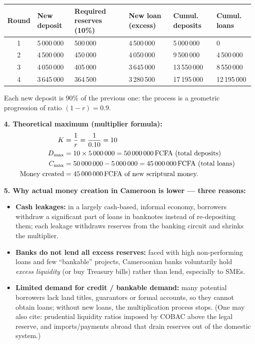 \documentclass[11pt]{article}
\begin{document}
\begin{corrige}
\begin{center}
\begin{tabularx}{\linewidth}{|c|X|X|X|X|X|}
\hline
\rowcolor{popblueL} \textbf{Round} & \textbf{New deposit} & \textbf{Required reserves (10\%)} & \textbf{New loan (excess)} & \textbf{Cumul. deposits} & \textbf{Cumul. loans} \\
\hline
1 & 5\,000\,000 & 500\,000 & 4\,500\,000 & 5\,000\,000 & 0 \\
\hline
2 & 4\,500\,000 & 450\,000 & 4\,050\,000 & 9\,500\,000 & 4\,500\,000 \\
\hline
3 & 4\,050\,000 & 405\,000 & 3\,645\,000 & 13\,550\,000 & 8\,550\,000 \\
\hline
4 & 3\,645\,000 & 364\,500 & 3\,280\,500 & 17\,195\,000 & 12\,195\,000 \\
\hline
\end{tabularx}
\end{center}

Each new deposit is $90\%$ of the previous one: the process is a geometric progression of ratio $(1-r) = 0.9$.

\textbf{4. Theoretical maximum (multiplier formula):}
\begin{align*}
K &= \frac{1}{r} = \frac{1}{0.10} = 10 \\
D_{\max} &= 10 \times 5\,000\,000 = \SI{50\,000\,000}{FCFA} \text{ (total deposits)} \\
C_{\max} &= 50\,000\,000 - 5\,000\,000 = \SI{45\,000\,000}{FCFA} \text{ (total loans)} \\
\text{Money created} &= \SI{45\,000\,000}{FCFA} \text{ of new scriptural money.}
\end{align*}

\textbf{5. Why actual money creation in Cameroon is lower — three reasons:}
\begin{itemize}
\item \textbf{Cash leakages:} in a largely cash-based, informal economy, borrowers withdraw a significant part of loans in banknotes instead of re-depositing them; each leakage withdraws reserves from the banking circuit and shrinks the multiplier.
\item \textbf{Banks do not lend all excess reserves:} faced with high non-performing loans and few ``bankable'' projects, Cameroonian banks voluntarily hold \emph{excess liquidity} (or buy Treasury bills) rather than lend, especially to SMEs.
\item \textbf{Limited demand for credit / bankable demand:} many potential borrowers lack land titles, guarantors or formal accounts, so they cannot obtain loans; without new loans, the multiplication process stops. (One may also cite: prudential liquidity ratios imposed by COBAC above the legal reserve, and imports/payments abroad that drain reserves out of the domestic system.)
\end{itemize}
\end{corrige}
\end{document}
